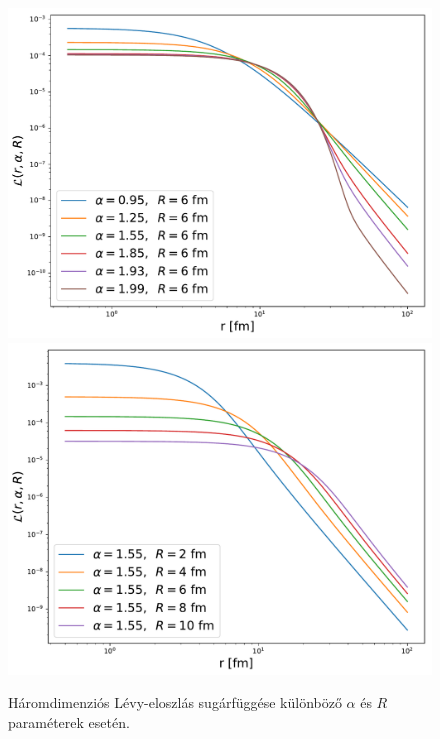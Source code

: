 \documentclass[11pt,a4paper]{article}
\numberwithin{equation}{subsection}
\numberwithin{figure}{section}
\begin{document}
\begin{figure}[H]
\centering
\includegraphics[scale=0.35]{pic/BEintro/Levy_alpha.pdf}
\includegraphics[scale=0.35]{pic/BEintro/Levy_R.pdf}
\caption{Háromdimenziós Lévy-eloszlás sugárfüggése különböző $\alpha$ és $R$ paraméterek esetén.}
\label{fig:Levy}
\end{figure}
\end{document}
